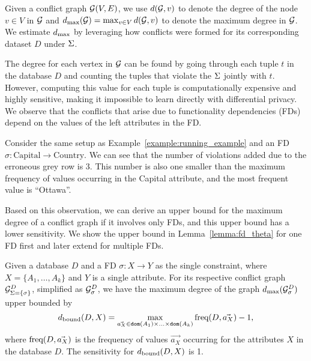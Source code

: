  \label{sec:dc_aware_ub}
Given a conflict graph $\mathcal{G}(V,E)$, we use $d(\mathcal{G}, v)$ to denote the degree of the node $v\in V$ in $\mathcal{G}$ and $d_{\max}(\mathcal{G}) = \max_{v\in V} d(\mathcal{G}, v)$ to denote the maximum degree in $\mathcal{G}$. We estimate $d_{\max}$ by leveraging how conflicts were formed for its corresponding dataset $D$ under ${\Sigma}$. 

The degree for each vertex in $\mathcal{G}$ can be found by going through each tuple $t$ in the database $D$ and counting the tuples that violate the ${\Sigma}$ jointly with $t$.
However, computing this value for each tuple is computationally expensive and highly sensitive, making it impossible to learn directly with differential privacy.  
We observe that the conflicts that arise due to functionality dependencies (FDs)  depend on the values of the left attributes in the FD. 
\begin{example}
    Consider the same setup as  Example~\ref{example:running_example}  and an FD 
$\sigma: \text{Capital}\rightarrow \text{Country}$. 
We can see that the number of violations added due to the erroneous grey row is 3. This number is also one smaller than the maximum frequency of values occurring in the Capital attribute, and the most frequent value is ``Ottawa''.
\end{example}

Based on this observation, we can derive an upper bound for the maximum degree of a conflict graph if it involves only FDs, and this upper bound has a lower sensitivity. We show the upper bound in Lemma~\ref{lemma:fd_theta} for one FD first and later extend for multiple FDs.  

\begin{lemma}\label{lemma:fd_theta}
Given a database $D$ and 
a FD $\sigma: X\rightarrow Y$ as the single constraint,
where $X = \{A_1,\dots,A_k\}$ and $Y$ is a single attribute. For its respective conflict graph $\mathcal{G}^D_{\Sigma = \{\sigma\}}$, simplified as $\mathcal{G}^D_{\sigma}$, we have the maximum degree of the graph $d_{\max}(\mathcal{G}^D_{\sigma})$ upper bounded by
    \begin{equation}
     d_{\normalfont{\text{bound}}}(D,X)
    =
    \max_{\vec{a_X} \in {\tt dom}(A_1) \times \ldots \times {\tt dom}(A_k) }  \normalfont{\text{freq}}(D, \vec{a_X})-1, 
    \end{equation}    
where $\normalfont{\text{freq}}(D, \vec{a_X})$ is the frequency of values $\vec{a_X}$ occurring for the attributes $X$ in the database $D$. 
The sensitivity for $d_{\normalfont{\text{bound}}}(D,X)$ is 1. %
\end{lemma}

